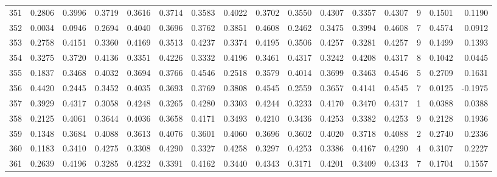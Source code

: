 \begin{tabular}{lrrrrrrrrrrrrrrr}
351 &      0.2806 &  0.3996 &  0.3719 &  0.3616 &  0.3714 &  0.3583 &  0.4022 &  0.3702 &  0.3550 &  0.4307 &   0.3357 &     0.4307 &      9 &                    0.1501 &                     0.1190 \\
352 &      0.0034 &  0.0946 &  0.2694 &  0.4040 &  0.3696 &  0.3762 &  0.3851 &  0.4608 &  0.2462 &  0.3475 &   0.3994 &     0.4608 &      7 &                    0.4574 &                     0.0912 \\
353 &      0.2758 &  0.4151 &  0.3360 &  0.4169 &  0.3513 &  0.4237 &  0.3374 &  0.4195 &  0.3506 &  0.4257 &   0.3281 &     0.4257 &      9 &                    0.1499 &                     0.1393 \\
354 &      0.3275 &  0.3720 &  0.4136 &  0.3351 &  0.4226 &  0.3332 &  0.4196 &  0.3461 &  0.4317 &  0.3242 &   0.4208 &     0.4317 &      8 &                    0.1042 &                     0.0445 \\
355 &      0.1837 &  0.3468 &  0.4032 &  0.3694 &  0.3766 &  0.4546 &  0.2518 &  0.3579 &  0.4014 &  0.3699 &   0.3463 &     0.4546 &      5 &                    0.2709 &                     0.1631 \\
356 &      0.4420 &  0.2445 &  0.3452 &  0.4035 &  0.3693 &  0.3769 &  0.3808 &  0.4545 &  0.2559 &  0.3657 &   0.4141 &     0.4545 &      7 &                    0.0125 &                    -0.1975 \\
357 &      0.3929 &  0.4317 &  0.3058 &  0.4248 &  0.3265 &  0.4280 &  0.3303 &  0.4244 &  0.3233 &  0.4170 &   0.3470 &     0.4317 &      1 &                    0.0388 &                     0.0388 \\
358 &      0.2125 &  0.4061 &  0.3644 &  0.4036 &  0.3658 &  0.4171 &  0.3493 &  0.4210 &  0.3436 &  0.4253 &   0.3382 &     0.4253 &      9 &                    0.2128 &                     0.1936 \\
359 &      0.1348 &  0.3684 &  0.4088 &  0.3613 &  0.4076 &  0.3601 &  0.4060 &  0.3696 &  0.3602 &  0.4020 &   0.3718 &     0.4088 &      2 &                    0.2740 &                     0.2336 \\
360 &      0.1183 &  0.3410 &  0.4275 &  0.3308 &  0.4290 &  0.3327 &  0.4258 &  0.3297 &  0.4253 &  0.3386 &   0.4167 &     0.4290 &      4 &                    0.3107 &                     0.2227 \\
361 &      0.2639 &  0.4196 &  0.3285 &  0.4232 &  0.3391 &  0.4162 &  0.3440 &  0.4343 &  0.3171 &  0.4201 &   0.3409 &     0.4343 &      7 &                    0.1704 &                     0.1557 \\

\end{tabular}
